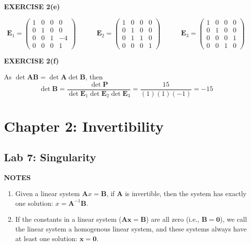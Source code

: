 \documentclass[12pt]{article}
\newcommand{\mat}[1]{\mathbf{#1}}
\newcommand{\exercise}[1]{\textbf{EXERCISE #1}\label{#1}}
\newcommand{\notes}{\textbf{NOTES}}
\begin{document}
\exercise{2(e)}

\begin{equation*}
\mat{E}_{1} = \begin{pmatrix}
  1 & 0 & 0 & 0 \\
  0 & 1 & 0 & 0 \\
  0 & 0 & 1 & -4 \\
  0 & 0 & 0 & 1
\end{pmatrix} 
\hspace{3em}
\mat{E}_{2} = \begin{pmatrix}
  1 & 0 & 0 & 0 \\
  0 & 1 & 0 & 0 \\
  0 & 1 & 1 & 0 \\
  0 & 0 & 0 & 1
\end{pmatrix} 
\hspace{3em}
\mat{E}_{3} = \begin{pmatrix}
  1 & 0 & 0 & 0 \\
  0 & 1 & 0 & 0 \\
  0 & 0 & 0 & 1 \\
  0 & 0 & 1 & 0
\end{pmatrix}
\end{equation*}

\exercise{2(f)}

As $\det \mat{AB} = \det \mat{A} \det \mat{B}$, then
\begin{equation*}
\det \mat{B} = \frac{ \det \mat{P} }{ \det \mat{E}_{1} \det \mat{E}_{2} \det \mat{E}_{3} } = \frac{15}{ (1)(1)(-1) } = -15
\end{equation*}

\section{Chapter 2: Invertibility}

\subsection{Lab 7: Singularity}

\notes

\begin{enumerate}
\item Given a linear system $\mat{A}x = \mat{B}$, if $\mat{A}$ is invertible, then the system has exactly one solution: $x = \mat{A}^{-1} \mat{B}$.
\item If the constants in a linear system ($\mat{Ax = B}$) are all zero (i.e., $\mat{B = 0}$), we call the linear system a homogenous linear system, and these systems always have at least one solution: $\mat{x = 0}$.
\end{enumerate}
\end{document}
